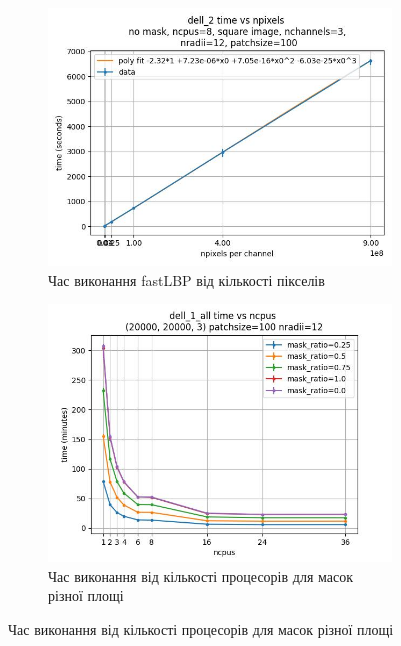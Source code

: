 \begin{figure}[h]
    \begin{subfigure}{0.45\textwidth}
    \includegraphics[width=0.99\linewidth]{img/fastlbp/complexity-time_npixels_nc3.jpg}
    \caption{
        Час виконання fastLBP від кількості пікселів
    }
    \label{subfig:time-vs-npixels}
    \end{subfigure}%
    \begin{subfigure}{0.45\textwidth}
    \includegraphics[width=0.99\linewidth]{img/fastlbp/time_ncpus.jpg} 
    \caption{
        Час виконання від кількості процесорів для масок різної площі
    }
    \label{subfig:parallell-efficiency-a}
    \end{subfigure}


\end{figure}
